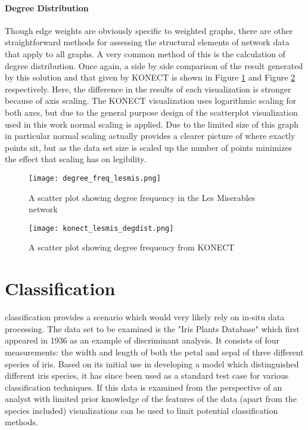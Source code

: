 \paragraph{Degree Distribution}
Though edge weights are obviously specific to weighted graphs, there are other straightforward methods for assessing the structural elements of network data that apply to all graphs. A very common method of this is the calculation of degree distribution. Once again, a side by side comparison of the result generated by this solution and that given by KONECT is shown in Figure \ref{fig:degfreqlesmis} and Figure \ref{fig:degfreqkonect} respectively. Here, the difference in the results of each visualization is stronger because of axis scaling. The KONECT visualization uses logarithmic scaling for both axes, but due to the general purpose design of the scatterplot visualization used in this work normal scaling is applied. Due to the limited size of this graph in particular normal scaling actually provides a clearer picture of where exactly points sit, but as the data set size is scaled up the number of points minimizes the effect that scaling has on legibility. 

\begin{figure}
	\centering
		\centering
		\texttt{[image: degree\_freq\_lesmis.png]}
		\caption{A scatter plot showing degree frequency in the Les Miserables network}
		\label{fig:degfreqlesmis}
\end{figure}
\begin{figure}
	\centering
		\texttt{[image: konect\_lesmis\_degdist.png]}
		\caption{A scatter plot showing degree frequency from KONECT}
		\label{fig:degfreqkonect}
\end{figure}

\section{Classification}
\label{sec:classification}
 classification provides a scenario which would very likely rely on in-situ data processing. The data set to be examined is the "Iris Plants Database" \cite{Fisher1936} which first appeared in 1936 as an example of discriminant analysis. It consists of four measurements: the width and length of both the petal and sepal of three different species of iris. Based on its initial use in developing a model which distinguished different iris species, it has since been used as a standard test case for various classification techniques. If this data is examined from the perspective of an analyst with limited prior knowledge of the features of the data (apart from the species included) visualizations can be used to limit potential classification methods. 

